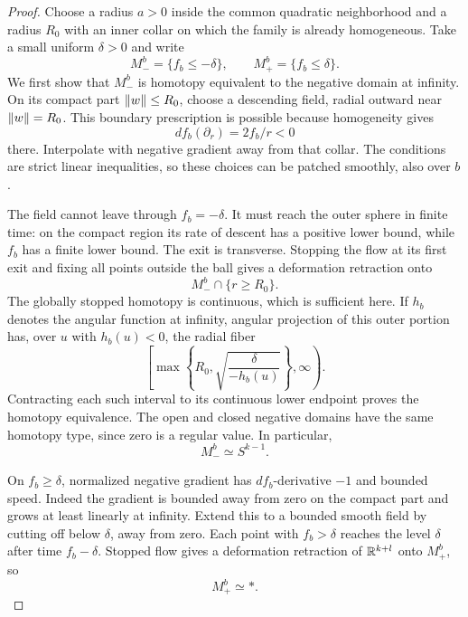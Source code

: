 \begin{proof}
Choose a radius $a>0$ inside the common quadratic neighborhood and a radius $R_0$ with an inner collar on which the family is already homogeneous. Take a small uniform $\delta>0$ and write
\[
 M_-^b=\{f_b\leq-\delta\},\qquad M_+^b=\{f_b\leq\delta\}.
\]
We first show that $M_-^b$ is homotopy equivalent to the negative domain at infinity. On its compact part $\lVert w\rVert\leq R_0$, choose a descending field, radial outward near $\lVert w\rVert=R_0$. This boundary prescription is possible because homogeneity gives
\[
 df_b(\partial_r)=2f_b/r<0
\]
there. Interpolate with negative gradient away from that collar. The conditions are strict linear inequalities, so these choices can be patched smoothly, also over $b$.

The field cannot leave through $f_b=-\delta$. It must reach the outer sphere in finite time: on the compact region its rate of descent has a positive lower bound, while $f_b$ has a finite lower bound. The exit is transverse. Stopping the flow at its first exit and fixing all points outside the ball gives a deformation retraction onto
\[
 M_-^b\cap\{r\geq R_0\}.
\]
The globally stopped homotopy is continuous, which is sufficient here. If $h_b$ denotes the angular function at infinity, angular projection of this outer portion has, over $u$ with $h_b(u)<0$, the radial fiber
\[
 \left[\max\left\{R_0,\sqrt{\frac{\delta}{-h_b(u)}}\right\},\infty\right).
\]
Contracting each such interval to its continuous lower endpoint proves the homotopy equivalence. The open and closed negative domains have the same homotopy type, since zero is a regular value. In particular,
\begin{equation}\label{eq:negative-sublevel-type}
 M_-^b\simeq S^{k-1}.
\end{equation}

On $f_b\geq\delta$, normalized negative gradient has $df_b$-derivative $-1$ and bounded speed. Indeed the gradient is bounded away from zero on the compact part and grows at least linearly at infinity. Extend this to a bounded smooth field by cutting off below $\delta$, away from zero. Each point with $f_b>\delta$ reaches the level $\delta$ after time $f_b-\delta$. Stopped flow gives a deformation retraction of $\mathbb R^{k+l}$ onto $M_+^b$, so
\begin{equation}\label{eq:positive-sublevel-type}
 M_+^b\simeq *.
\end{equation}


\end{proof}
